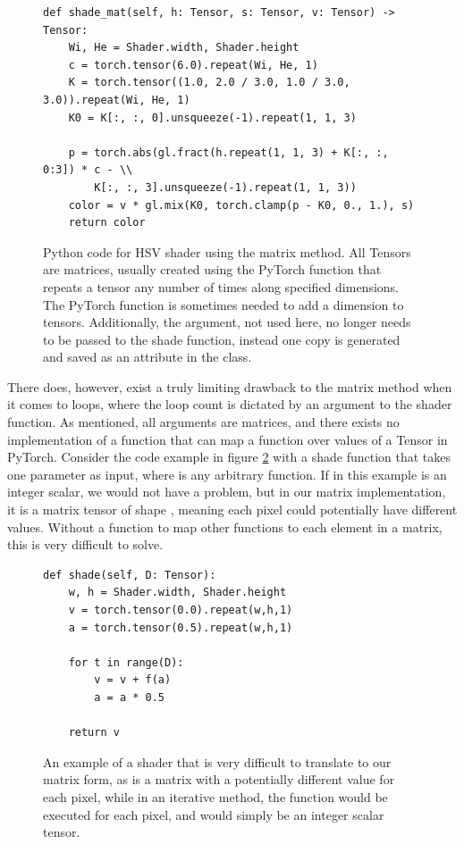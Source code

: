 \begin{figure}[h]
    \begin{verbatim}
def shade_mat(self, h: Tensor, s: Tensor, v: Tensor) -> Tensor:
    Wi, He = Shader.width, Shader.height
    c = torch.tensor(6.0).repeat(Wi, He, 1)
    K = torch.tensor((1.0, 2.0 / 3.0, 1.0 / 3.0, 3.0)).repeat(Wi, He, 1)
    K0 = K[:, :, 0].unsqueeze(-1).repeat(1, 1, 3)
    
    p = torch.abs(gl.fract(h.repeat(1, 1, 3) + K[:, :, 0:3]) * c - \\
        K[:, :, 3].unsqueeze(-1).repeat(1, 1, 3))
    color = v * gl.mix(K0, torch.clamp(p - K0, 0., 1.), s)
    return color
    \end{verbatim}
    \caption{Python code for HSV shader using the matrix method. All Tensors are matrices, usually created using the PyTorch  function that repeats a tensor any number of times along specified dimensions. The PyTorch function  is sometimes needed to add a dimension to tensors. Additionally, the  argument, not used here, no longer needs to be passed to the shade function, instead one copy is generated and saved as an attribute in the  class.}
    \label{fig:MatrixMethodHSV}
\end{figure}

There does, however, exist a truly limiting drawback to the matrix method when it comes to loops, where the loop count is dictated by an argument to the shader function. As mentioned, all arguments are matrices, and there exists no implementation of a function that can map a function over values of a Tensor in PyTorch. Consider the code example in figure \ref{fig:MatrixMethodForProblem} with a shade function that takes one parameter  as input, where  is any arbitrary function. If  in this example is an integer scalar, we would not have a problem, but in our matrix implementation, it is a matrix tensor of shape , meaning each pixel could potentially have different values. Without a function to map other functions to each element in a matrix, this is very difficult to solve.

\begin{figure}
    \centering
    \begin{verbatim}
def shade(self, D: Tensor):
    w, h = Shader.width, Shader.height
    v = torch.tensor(0.0).repeat(w,h,1)
    a = torch.tensor(0.5).repeat(w,h,1)

    for t in range(D):
        v = v + f(a)
        a = a * 0.5
        
    return v
    \end{verbatim}
    \caption{An example of a shader that is very difficult to translate to our matrix form, as  is a matrix with a potentially different value for each pixel, while in an iterative method, the  function would be executed for each pixel, and  would simply be an integer scalar tensor.}
    \label{fig:MatrixMethodForProblem}
\end{figure}

